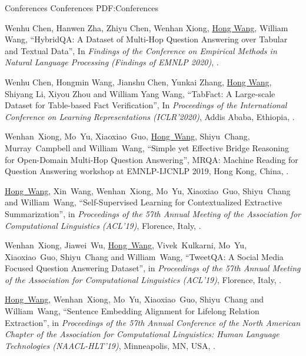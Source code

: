 \documentclass[letterpaper,MMMyyyy,nonstopmode]{simpleresumecv}
\begin{document}
\begin{Body}

\BigGap
\SubSection
{Conferences}
{Conferences}
{PDF:Conferences}

\begin{enumerate}[label={[\arabic*]~~}]
\item
Wenhu Chen, Hanwen Zha, Zhiyu Chen, Wenhan Xiong, \underline{Hong Wang}, William Wang,
``HybridQA: A Dataset of Multi-Hop Question Answering over Tabular and Textual Data'',
In \textit{Findings of the Conference on Empirical Methods in Natural Language Processing (Findings of EMNLP 2020)},
.

\item
Wenhu Chen, Hongmin Wang, Jianshu Chen, Yunkai Zhang, \underline{Hong Wang}, Shiyang Li, Xiyou Zhou and William Yang Wang,
``TabFact: A Large-scale Dataset for Table-based Fact Verification'',
In \textit{Proceedings of the International Conference on Learning Representations (ICLR'2020)}, Addis Ababa, Ethiopia,
.

\item
Wenhan~Xiong, Mo~Yu, Xiaoxiao~Guo, \underline{Hong~Wang}, Shiyu~Chang, Murray~Campbell and William~Wang,
``Simple yet Effective Bridge Reasoning for Open-Domain Multi-Hop Question Answering'',
MRQA: Machine Reading for Question Answering workshop at EMNLP-IJCNLP 2019, Hong Kong, China,
.

\item
\underline{Hong~Wang}, Xin~Wang, Wenhan~Xiong, Mo~Yu, Xiaoxiao~Guo, Shiyu~Chang and William~Wang,
``Self-Supervised Learning for Contextualized Extractive Summarization'',
in \textit{Proceedings of the 57th Annual Meeting of the Association for Computational Linguistics (ACL'19)},
Florence, Italy,
.

\item
Wenhan~Xiong, Jiawei~Wu, \underline{Hong~Wang}, Vivek~Kulkarni, Mo~Yu, Xiaoxiao~Guo, Shiyu~Chang and William~Wang,
``TweetQA: A Social Media Focused Question Answering Dataset'',
in \textit{Proceedings of the 57th Annual Meeting of the Association for Computational Linguistics (ACL'19)},
Florence, Italy,
.

\item
\underline{Hong~Wang}, Wenhan~Xiong, Mo~Yu, Xiaoxiao~Guo, Shiyu~Chang and William~Wang,
``Sentence Embedding Alignment for Lifelong Relation Extraction'',
in \textit{Proceedings of the 57th Annual Conference of the North American Chapter of the Association for Computational Linguistics: Human Language Technologies (NAACL-HLT'19)},
Minneapolis, MN, USA,
.


\end{enumerate}
\end{Body}
\end{document}
